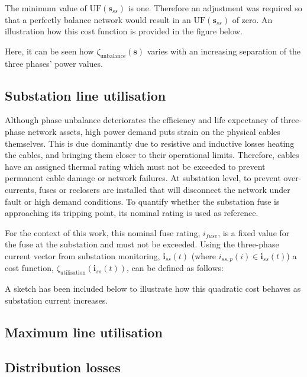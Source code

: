

The minimum value of $\text{UF}(\textbf{s}_{ss})$ is one.
Therefore an adjustment was required so that a perfectly balance network would result in an $\text{UF}(\textbf{s}_{ss})$ of zero.
An illustration how this cost function is provided in the figure below.



Here, it can be seen how $\zeta_\text{unbalance}(\textbf{s})$ varies with an increasing separation of the three phases' power values.

\subsection{Substation line utilisation}
\label{ch1:subsec:substation-line-utilisation}

Although phase unbalance deteriorates the efficiency and life expectancy of three-phase network assets, high power demand puts strain on the physical cables themselves.
This is due dominantly due to resistive and inductive losses heating the cables, and bringing them closer to their operational limits.
Therefore, cables have an assigned thermal rating which must not be exceeded to prevent permanent cable damage or network failures.
At substation level, to prevent over-currents, fuses or reclosers are installed that will disconnect the network under fault or high demand conditions.
To quantify whether the substation fuse is approaching its tripping point, its nominal rating is used as reference.

For the context of this work, this nominal fuse rating, $i_{fuse}$, is a fixed value for the fuse at the substation and must not be exceeded.
Using the three-phase current vector from substation monitoring, $\textbf{i}_{ss}(t)$ (where $i_{ss,p}(i) \in \textbf{i}_{ss}(t)$) a cost function, $\zeta_\text{utilisation}(\textbf{i}_{ss}(t))$, can be defined as follows:



A sketch has been included below to illustrate how this quadratic cost behaves as substation current increases.



\subsection{Maximum line utilisation}
\label{ch1:subsec:maximum-line-utilisation}


\subsection{Distribution losses}
\label{ch1:subsec:losses}




